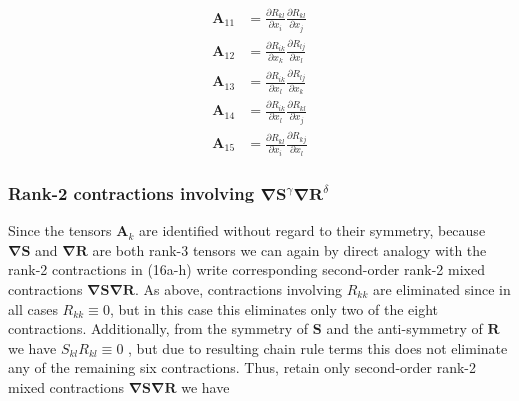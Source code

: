%
\begin{subequations}
\begin{align}
	\label{E:34}
	\mathbf{A}_{11}  &= \frac{\partial R_{kl}}{\partial x_i}
					  \frac{\partial R_{kl}}{\partial x_j} \\
	\mathbf{A}_{12}  &= \frac{\partial R_{ik}}{\partial x_k}
					  \frac{\partial R_{lj}}{\partial x_l} \\
	\mathbf{A}_{13}  &= \frac{\partial R_{ik}}{\partial x_l}
					  \frac{\partial R_{lj}}{\partial x_k} \\
	\mathbf{A}_{14}  &= \frac{\partial R_{ik}}{\partial x_l}
					  \frac{\partial R_{kl}}{\partial x_j} \\
	\mathbf{A}_{15}  &= \frac{\partial R_{kl}}{\partial x_i}
				      \frac{\partial R_{kj}}{\partial x_l}    
\end{align}
\end{subequations}
%
%    
	 
\subsubsection{Rank-2 contractions involving $\mathbf{\nabla S}^{\gamma} \mathbf{\nabla R}^{\delta}$}

Since the tensors  $\mathbf{A}_k$ are identified without regard to their symmetry, because  $\mathbf{\nabla S}$ and  $\mathbf{\nabla R}$ are both rank-3 tensors we can again by direct analogy with the rank-2 contractions in (16a-h) write corresponding second-order rank-2 mixed contractions $\mathbf{\nabla S \nabla R}$. As above, contractions involving $R_{kk}$  are eliminated since in all cases $R_{kk} \equiv 0$, but in this case this eliminates only two of the eight contractions.  Additionally, from the symmetry of $\mathbf{S}$ and the anti-symmetry of $\mathbf{R}$ we have $S_{kl} R_{kl} \equiv 0$ , but due to resulting chain rule terms this does not eliminate any of the remaining six contractions.  Thus, retain only second-order rank-2 mixed contractions $\mathbf{\nabla S \nabla R}$ we have

